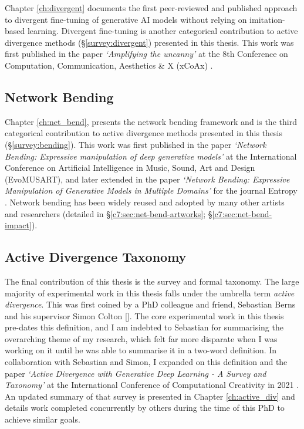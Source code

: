 Chapter \ref{ch:divergent} documents the first peer-reviewed and published approach to divergent fine-tuning of generative AI models without relying on imitation-based learning.
Divergent fine-tuning is another categorical contribution to active divergence methods (\S \ref{survey:divergent}) presented in this thesis.
This work was first published in the paper \textit{`Amplifying the uncanny'} at the 8th Conference on Computation, Communication, Aesthetics \& X (xCoAx) \citep{broad2020amplifying}.


\subsection{Network Bending}

Chapter \ref{ch:net_bend}, presents the network bending framework and is the third categorical contribution to active divergence methods presented in this thesis (\S \ref{survey:bending}).
This work was first published in the paper \textit{`Network Bending: Expressive manipulation of deep generative models'} at the International Conference on Artificial Intelligence in Music, Sound, Art and Design (EvoMUSART)\citep{broad2020network}, and later extended in the paper \textit{`Network Bending: Expressive Manipulation of Generative Models in Multiple Domains'} for the journal Entropy \citep{broad2021network}.
Network bending has been widely reused and adopted by many other artists and researchers (detailed in \S \ref{c7:sec:net-bend-artworks}; \S \ref{c7:sec:net-bend-impact}).

\subsection{Active Divergence Taxonomy}

The final contribution of this thesis is the survey and formal taxonomy. 
The large majority of experimental work in this thesis falls under the umbrella term \textit{active divergence}. 
This was first coined by a PhD colleague and friend, Sebastian Berns and his supervisor Simon Colton [\citeyear{berns2020bridging}]. 
The core experimental work in this thesis pre-dates this definition, and I am indebted to Sebastian for summarising the overarching theme of my research, which felt far more disparate when I was working on it until he was able to summarise it in a two-word definition. 
In collaboration with Sebastian and Simon, I expanded on this definition and the paper \textit{`Active Divergence with Generative Deep Learning - A Survey and Taxonomy'} at the International Conference of Computational Creativity in 2021 \citep{broad2021active}.
An updated summary of that survey is presented in Chapter \ref{ch:active_div} and details work completed concurrently by others during the time of this PhD to achieve similar goals.

